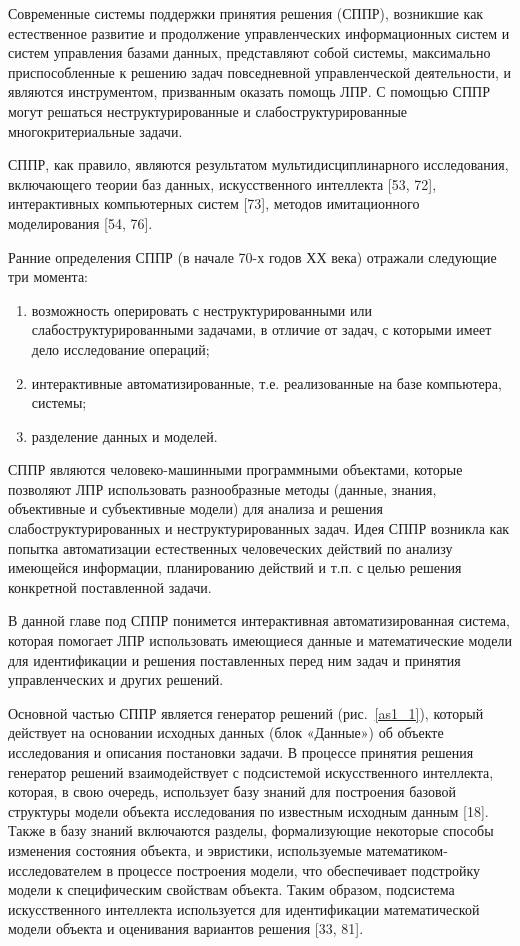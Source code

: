 Современные системы поддержки принятия решения (СППР), возникшие как естественное развитие и продолжение управленческих информационных систем и систем управления базами данных, представляют собой системы, максимально приспособленные к решению задач повседневной управленческой деятельности, и являются инструментом, призванным оказать помощь ЛПР. С помощью СППР могут решаться неструктурированные и слабоструктурированные многокритериальные задачи.

СППР, как правило, являются результатом мультидисциплинарного исследования, включающего теории баз данных, искусственного интеллекта [53, 72], интерактивных компьютерных систем [73], методов имитационного моделирования [54, 76].

Ранние определения СППР (в начале 70-х годов ХХ века) отражали следующие три момента:
\begin{enumerate}
\item возможность оперировать с неструктурированными или слабоструктурированными задачами, в отличие от задач, с которыми имеет дело исследование операций;
\item интерактивные автоматизированные, т.е. реализованные на базе компьютера, системы;
\item разделение данных и моделей.
\end{enumerate}

СППР являются человеко-машинными программными объектами, которые позволяют ЛПР использовать разнообразные методы (данные, знания, объективные и субъективные модели) для анализа и решения слабоструктурированных и неструктурированных задач. Идея СППР возникла как попытка автоматизации естественных человеческих действий по анализу имеющейся информации, планированию действий и т.п. с целью решения конкретной поставленной задачи.

В данной главе под СППР понимется интерактивная автоматизированная система, которая помогает ЛПР использовать имеющиеся данные и математические модели для идентификации и решения поставленных перед ним задач и принятия управленческих и других решений.

Основной частью СППР является генератор решений (рис.~\ref{as1_1}), который действует на основании исходных данных (блок «Данные») об объекте исследования и описания постановки задачи. В процессе принятия решения генератор решений взаимодействует с подсистемой искусственного интеллекта, которая, в свою очередь, использует базу знаний для построения базовой структуры модели объекта исследования по известным исходным данным [18]. Также в базу знаний включаются разделы, формализующие некоторые способы изменения состояния объекта, и эвристики, используемые математиком-исследователем в процессе построения модели, что обеспечивает подстройку модели к специфическим свойствам объекта. Таким образом, подсистема искусственного интеллекта используется для идентификации математической модели объекта и оценивания вариантов решения [33, 81].

